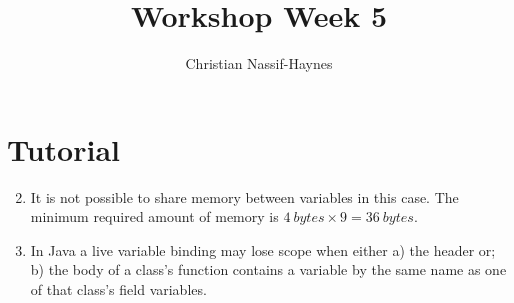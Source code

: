 \documentclass[a4paper]{article}
\begin{document}
	\title{Workshop Week 5}
	\author{Christian Nassif-Haynes}
	\maketitle
	
	\section*{Tutorial}
	\begin{enumerate}
		\setcounter{enumi}{1}
		\item It is not possible to share memory between variables in this case. The minimum required amount of memory is $4\ bytes \times 9 = 36\ bytes$.
		\setcounter{enumi}{3}
		\item In Java a live variable binding may lose scope when either a) the header or; b) the body of a class's function contains a variable by the same name as one of that class's field variables.
	\end{enumerate}
\end{document}
